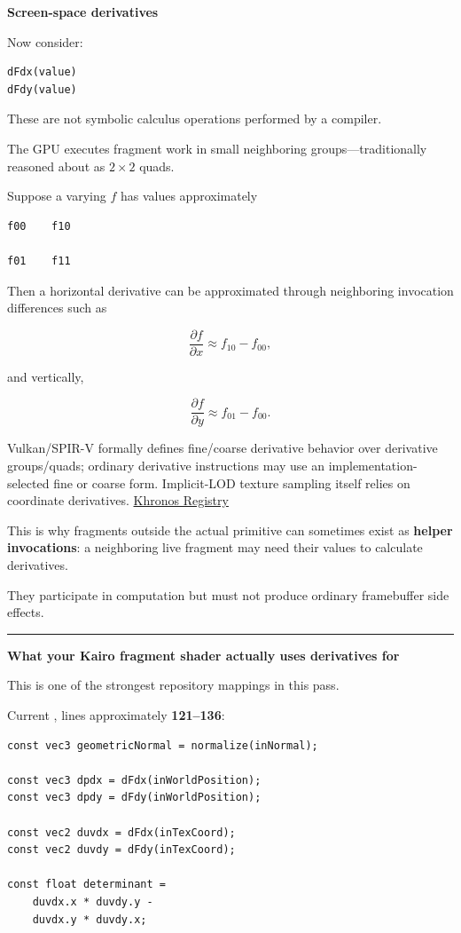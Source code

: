 \textbf{Screen-space derivatives}

Now consider:

\begin{verbatim}
dFdx(value)
dFdy(value)
\end{verbatim}

These are not symbolic calculus operations performed by a compiler.

The GPU executes fragment work in small neighboring groups---traditionally reasoned about as \(2\times2\) quads.

Suppose a varying \(f\) has values approximately

\begin{verbatim}
f00    f10

f01    f11
\end{verbatim}

Then a horizontal derivative can be approximated through neighboring invocation differences such as

\[
\frac{\partial f}{\partial x}
\approx
f_{10}-f_{00},
\]

and vertically,

\[
\frac{\partial f}{\partial y}
\approx
f_{01}-f_{00}.
\]

Vulkan/SPIR-V formally defines fine/coarse derivative behavior over derivative groups/quads; ordinary derivative instructions may use an implementation-selected fine or coarse form. Implicit-LOD texture sampling itself relies on coordinate derivatives. \href{https://registry.khronos.org/vulkan/specs/latest/pdf/vkspec.pdf?utm_source=chatgpt.com}{Khronos Registry}

This is why fragments outside the actual primitive can sometimes exist as \textbf{helper invocations}: a neighboring live fragment may need their values to calculate derivatives.

They participate in computation but must not produce ordinary framebuffer side effects.

\begin{center}\rule{0.5\linewidth}{0.5pt}\end{center}

\textbf{What your Kairo fragment shader actually uses derivatives for}

This is one of the strongest repository mappings in this pass.

Current , lines approximately \textbf{121--136}:

\begin{verbatim}
const vec3 geometricNormal = normalize(inNormal);

const vec3 dpdx = dFdx(inWorldPosition);
const vec3 dpdy = dFdy(inWorldPosition);

const vec2 duvdx = dFdx(inTexCoord);
const vec2 duvdy = dFdy(inTexCoord);

const float determinant =
    duvdx.x * duvdy.y -
    duvdx.y * duvdy.x;
\end{verbatim}

